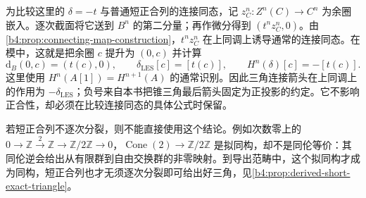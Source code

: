 为比较这里的 \(\delta=-t\) 与普通短正合列的连接同态，记 \(z_C^n:Z^n(C)\to C^n\) 为余圈嵌入。逐次截面将它送到 \(B^n\) 的第二分量；再作微分得到 \((t^nz_C^n,0)\)。由\cref{b4:prop:connecting-map-construction}，\(t^nz_C^n\) 在上同调上诱导通常的连接同态。在模中，这就是把余圈 \(c\) 提升为 \((0,c)\) 并计算
\[
	\mathrm{d}_B(0,c)=(t(c),0),\qquad \delta_{\mathrm{LES}}[c]=[t(c)],\qquad H^n(\delta)[c]=-[t(c)].
\]
这里使用 \(H^n(A[1])=H^{n+1}(A)\) 的通常识别。因此三角连接箭头在上同调上的作用为 \(-\delta_{\mathrm{LES}}\)；负号来自本书把锥三角最后箭头固定为正投影的约定。它不影响正合性，却必须在比较连接同态的具体公式时保留。

\ProseParagraphBreak
若短正合列不逐次分裂，则不能直接使用这个结论。例如次数零上的 \(0\to\mathbb Z\xrightarrow{2}\mathbb Z\to\mathbb Z/2\mathbb Z\to0\)，\(\operatorname{Cone}(2)\to\mathbb Z/2\mathbb Z\) 是拟同构，却不是同伦等价：其同伦逆会给出从有限群到自由交换群的非零映射。到导出范畴中，这个拟同构才成为同构，短正合列也才无须逐次分裂即可给出好三角，见\cref{b4:prop:derived-short-exact-triangle}。
